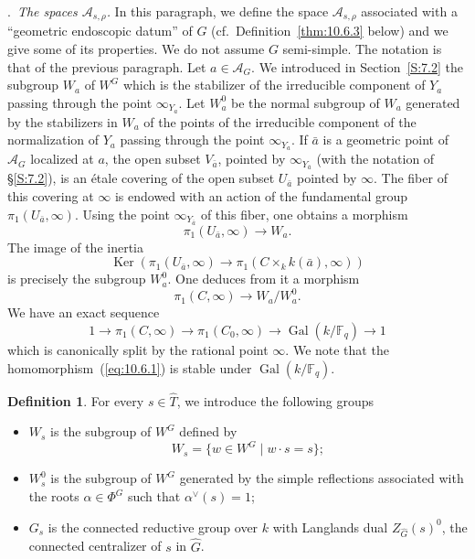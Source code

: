 \documentclass[12pt,a4paper,oneside,english,leqno]{smfart}
\makeatletter
\numberwithin{equation}{subsection}
\newcounter{theo}
\numberwithin{theo}{subsection}
\newenvironment{paragr}[1][]{\medskip\refstepcounter{subsection}%
  \par\noindent\hspace*{\parindent}\thesubsection.\ \emph{#1}%
  \@ifundefined{@empty}{}{}\ignorespaces}{\medskip}
\theoremstyle{plain}
\theoremstyle{definition}
\newtheorem{definition}[theo]{Definition}
\theoremstyle{remark}
\DeclareMathOperator{\Gal}{Gal}
\DeclareMathOperator{\Ker}{Ker}
\newcommand{\Fq}{\mathbb{F}_q}
\newcommand{\Ac}{\mathcal{A}}
\newcommand{\Gc}{\widehat{G}}
\newcommand{\Tc}{\widehat{T}}
\newcommand{\al}{\alpha}
\makeatother
\begin{document}
\begin{paragr}[The spaces $\Ac_{s,\rho}$.]\label{S:10.6}
In this paragraph, we define the space $\Ac_{s,\rho}$ associated with a ``geometric endoscopic datum'' of $G$ (cf.\ Definition~\ref{thm:10.6.3} below) and we give some of its properties. We do not assume $G$ semi-simple. The notation is that of the previous paragraph. Let $a\in\Ac_G$. We introduced in Section~\ref{S:7.2} the subgroup $W_a$ of $W^G$ which is the stabilizer of the irreducible component of $Y_a$ passing through the point $\infty_{Y_a}$. Let $W_a^0$ be the normal subgroup of $W_a$ generated by the stabilizers in $W_a$ of the points of the irreducible component of the normalization of $Y_a$ passing through the point $\infty_{Y_a}$. If $\bar{a}$ is a geometric point of $\Ac_G$ localized at $a$, the open subset $V_{\bar{a}}$, pointed by $\infty_{Y_{\bar{a}}}$ (with the notation of \S\ref{S:7.2}), is an étale covering of the open subset $U_{\bar{a}}$ pointed by $\infty$. The fiber of this covering at $\infty$ is endowed with an action of the fundamental group $\pi_1(U_{\bar{a}},\infty)$. Using the point $\infty_{Y_{\bar{a}}}$ of this fiber, one obtains a morphism
$$\pi_1(U_{\bar{a}},\infty)\to W_a.$$
The image of the inertia
$$\Ker(\pi_1(U_{\bar{a}},\infty)\to\pi_1(C\times_k k(\bar{a}),\infty))$$
is precisely the subgroup $W_a^0$. One deduces from it a morphism
\begin{equation}\label{eq:10.6.1}
\pi_1(C,\infty)\to W_a/W_a^0.
\end{equation}
We have an exact sequence
$$1\longrightarrow\pi_1(C,\infty)\longrightarrow\pi_1(C_0,\infty)\longrightarrow\Gal(k/\Fq)\longrightarrow 1$$
which is canonically split by the rational point $\infty$. We note that the homomorphism~(\ref{eq:10.6.1}) is stable under $\Gal(k/\Fq)$.

\begin{definition}\label{thm:10.6.1}
For every $s\in\Tc$, we introduce the following groups
\begin{itemize}
\item[--] $W_s$ is the subgroup of $W^G$ defined by
  $$W_s = \{w\in W^G\mid w\cdot s = s\};$$
\item[--] $W_s^0$ is the subgroup of $W^G$ generated by the simple reflections associated with the roots $\al\in\Phi^G$ such that $\al^\vee(s) = 1$; \item[--] $G_s$ is the connected reductive group over $k$ with Langlands dual $Z_{\Gc}(s)^0$, the connected centralizer of $s$ in $\Gc$.
\end{itemize}
\end{definition}


\end{paragr}
\end{document}
